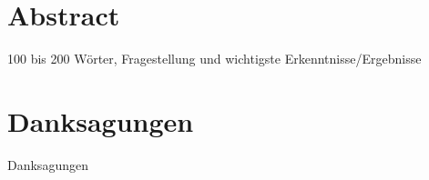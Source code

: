 \documentclass[oneside,12pt,a4paper]{report}
\begin{document}
\section*{Abstract}

100 bis 200 Wörter, Fragestellung und wichtigste Erkenntnisse/Ergebnisse
\newpage

\section*{Danksagungen}

Danksagungen

\cleardoublepage


\renewcommand{\baselinestretch}{1.3}
\small\normalsize

\tableofcontents

\renewcommand{\baselinestretch}{1}
\small\normalsize

\cleardoublepage


\setcounter{page}{1}


\cleardoublepage


\cleardoublepage


\cleardoublepage


\cleardoublepage



%
%

\printbibliography

\end{document}
